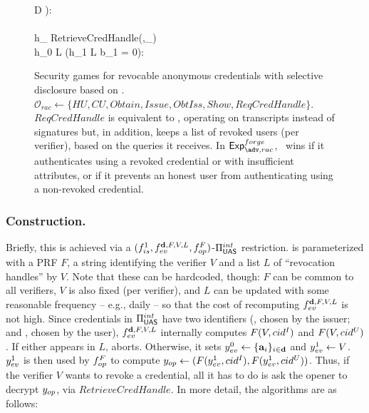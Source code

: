 \begin{figure}[ht!]
{\begin{minipage}[t]{.57\textwidth}
{        \land D \subseteq \ATTR[j]): \\
        \pcind {} \\
        h_{\bin} \gets RetrieveCredHandle(\osk,\utrans_{\bin}) \\
        \pcif h_0 \in L \lor (h_1 \notin L \land b_1 = 0):  \\
      }       
    \end{minipage}      
  }
  \caption{Security games for revocable anonymous credentials with selective
    disclosure based on \cite{fhs19}. 
    $\mathcal{O}_{rac} \gets \lbrace HU,CU,Obtain,Issue,ObtIss,Show,
    ReqCredHandle\rbrace$. $ReqCredHandle$ is
    equivalent to \OPEN, operating on transcripts \utrans instead of signatures
    but, in addition, keeps a list of revoked users (per verifier), based on the
    queries it receives. In $\Exp^{forge}_{\adv,rac}$, \adv~wins if it
    authenticates using a revoked credential or with insufficient attributes, or
    if it prevents an honest user from authenticating using a non-revoked
    credential.}
  \label{fig:model-rac}  
\end{figure}

\subsubsection{\CUASRAC Construction.} %
Briefly, this is achieved via a $(f_{is}^1,f_{ev}^{\mathbf{d},F,V,L},
f_{op}^{F})$-$\Pi_{\mathsf{UAS}}^{int}$ restriction. \feval is parameterized with a PRF
$F$, a string identifying the verifier $V$ and a list $L$ of ``revocation
handles'' by $V$. Note that these can be hardcoded, though: $F$ can be common to
all verifiers, $V$ is also fixed (per verifier),
and $L$ can be updated with some reasonable frequency -- e.g., daily -- so that
the cost of recomputing $f_{ev}^{\mathbf{d},F,V,L}$ is not high.
%
Since credentials in $\Pi_{\mathsf{UAS}}^{int}$ have two identifiers (\cidi, chosen by the
issuer; and \cidu, chosen by the user), $f_{ev}^{\mathbf{d},F,V,L}$ internally
computes $F(V,cid^I)$ and $F(V,cid^U)$. If either appears in $L$, \feval aborts.
Otherwise, it sets $y_{ev}^0 \gets \lbrace \mathbf{a}_i \rbrace_{i\in\mathbf{d}}$ and
$y_{ev}^1 \gets V$. $y_{ev}^1$ is
then used by $f_{op}^F$ to compute $y_{op} \gets (F(y_{ev}^1,cid^I),
F(y_{ev}^1,cid^U))$. Thus, if the verifier $V$ wants to revoke a credential, all
it has to do is ask the opener to decrypt $y_{op}$, via $RetrieveCredHandle$.
%
In more detail, the algorithms are as follows:

